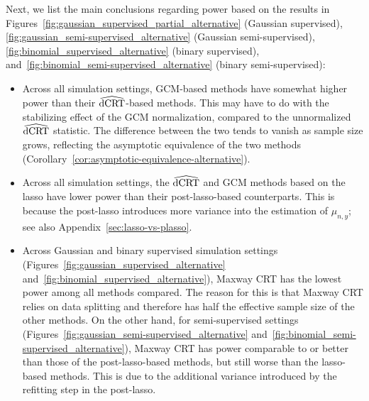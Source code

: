 \documentclass[12pt]{article}
\theoremstyle{definition}
\theoremstyle{remark}
\newcommand{\dCRThat}{\widehat{\textnormal{dCRT}}}		%
\begin{document}
	Next, we list the main conclusions regarding power based on the results in Figures~\ref{fig:gaussian_supervised_partial_alternative} (Gaussian supervised), \ref{fig:gaussian_semi-supervised_alternative} (Gaussian semi-supervised), \ref{fig:binomial_supervised_alternative} (binary supervised), and~\ref{fig:binomial_semi-supervised_alternative} (binary semi-supervised): 
	\begin{itemize}
		\item Across all simulation settings, GCM-based methods have somewhat higher power than their $\dCRThat$-based methods. This may have to do with the stabilizing effect of the GCM normalization, compared to the unnormalized $\dCRThat$ statistic. The difference between the two tends to vanish as sample size grows, reflecting the asymptotic equivalence of the two methods (Corollary~\ref{cor:asymptotic-equivalence-alternative}).
		\item Across all simulation settings, the $\dCRThat$ and GCM methods based on the lasso have lower power than their post-lasso-based counterparts. This is because the post-lasso introduces more variance into the estimation of $\mu_{n,y}$; see also Appendix~\ref{sec:lasso-vs-plasso}.
		\item Across Gaussian and binary supervised simulation settings (Figures~\ref{fig:gaussian_supervised_alternative} and~\ref{fig:binomial_supervised_alternative}), Maxway CRT has the lowest power among all methods compared. The reason for this is that Maxway CRT relies on data splitting and therefore has half the effective sample size of the other methods. On the other hand, for semi-supervised settings (Figures~\ref{fig:gaussian_semi-supervised_alternative} and~\ref{fig:binomial_semi-supervised_alternative}), Maxway CRT has power comparable to or better than those of the post-lasso-based methods, but still worse than the lasso-based methods. This is due to the additional variance introduced by the refitting step in the post-lasso.
	\end{itemize}
	
\end{document}

